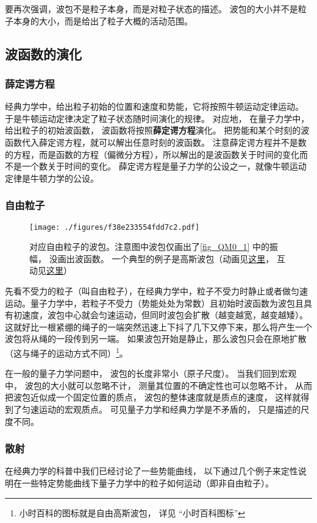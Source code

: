 要再次强调，波包不是粒子本身，而是对粒子状态的描述。 波包的大小并不是粒子本身的大小，而是给出了粒子大概的活动范围。

\subsection{波函数的演化}
\subsubsection{薛定谔方程}
经典力学中，给出粒子初始的位置和速度和势能，它将按照牛顿运动定律运动。 于是牛顿运动定律决定了粒子状态随时间演化的规律。 对应地， 在量子力学中， 给出粒子的初始波函数， 波函数将按照\textbf{薛定谔方程}演化。 把势能和某个时刻的波函数代入薛定谔方程，就可以解出任意时刻的波函数。 注意薛定谔方程并不是数的方程，而是函数的方程（偏微分方程），所以解出的是波函数关于时间的变化而不是一个数关于时间的变化。 薛定谔方程是量子力学的公设之一，就像牛顿运动定律是牛顿力学的公设。

\subsubsection{自由粒子}

\begin{figure}[ht]
\centering
\texttt{[image: ./figures/f38e233554fdd7c2.pdf]}
\caption{对应自由粒子的波包。注意图中波包仅画出了\autoref{fig_QM0_1} 中的振幅， 没画出波函数。 一个典型的例子是高斯波包（动画见\href{https://wuli.wiki/apps/free_gauss.html}{这里}， 互动见\href{https://wuli.wiki/apps/gausWP.html}{这里}）} \label{fig_QM0_2}
\end{figure}

先看不受力的粒子（叫自由粒子），在经典力学中，粒子不受力时静止或者做匀速运动。量子力学中，若粒子不受力（势能处处为常数）且初始时波函数为波包且具有初速度，波包中心就会匀速运动，但同时波包会扩散（越变越宽，越变越矮）。这就好比一根紧绷的绳子的一端突然迅速上下抖了几下又停下来，那么将产生一个波包将从绳的一段传到另一端。 如果波包开始是静止，那么波包只会在原地扩散（这与绳子的运动方式不同）\footnote{小时百科的图标就是自由高斯波包， 详见 “小时百科图标”}。

在一般的量子力学问题中， 波包的长度非常小（原子尺度）。 当我们回到宏观中， 波包的大小就可以忽略不计， 测量其位置的不确定性也可以忽略不计， 从而把波包近似成一个固定位置的质点， 波包的整体速度就是质点的速度， 这样就得到了匀速运动的宏观质点。 可见量子力学和经典力学是不矛盾的， 只是描述的尺度不同。

\subsubsection{散射}
在经典力学的科普中我们已经讨论了一些势能曲线， 以下通过几个例子来定性说明在一些特定势能曲线下量子力学中的粒子如何运动（即非自由粒子）。

